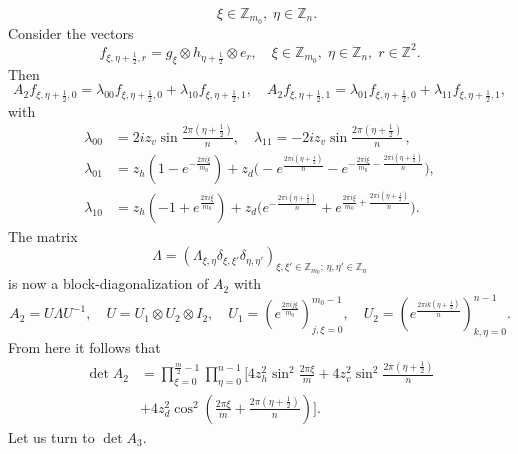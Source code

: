 \documentclass[12pt,reqno]{amsart}
\numberwithin{equation}{section}
\newcommand{\Z}{{\mathbb Z}}
\newcommand{\La}{\Lambda}
\newcommand{\la}{\lambda}
\newcommand{\de}{\delta}
\begin{document}
\begin{appendix}
\begin{equation}
\quad \xi\in\Z_{m_0},\; \eta\in\Z_n.
\end{equation}
Consider the vectors
\begin{equation}\label{k2m6}
f_{\xi,\eta+\frac{1}{2},r}=g_{\xi}\otimes h_{\eta+\frac{1}{2}}\otimes e_r,\quad \xi\in\Z_{m_0},\; \eta\in\Z_n,\; r\in \Z^2.
\end{equation}
Then
\begin{equation}\label{k2m7}
A_2 f_{\xi,\eta+\frac{1}{2},0}=\la_{00}f_{\xi,\eta+\frac{1}{2},0}+\la_{10}f_{\xi,\eta+\frac{1}{2},1},\quad
A_2 f_{\xi,\eta+\frac{1}{2},1}=\la_{01}f_{\xi,\eta+\frac{1}{2},0}+\la_{11}f_{\xi,\eta+\frac{1}{2},1},
\end{equation}
with
\begin{equation}\label{k2m8}
\begin{aligned}
\la_{00}&=2iz_v\sin\frac{2\pi \left(\eta+\frac{1}{2}\right)}{n},\quad 
\la_{11}=-2iz_v \sin\frac{2\pi \left(\eta+\frac{1}{2}\right)}{n}\,,\\
\la_{01}&=z_h(1-e^{-\frac{2\pi i\xi}{m_0}})+z_d\big(-e^{\frac{2\pi i\left(\eta+\frac{1}{2}\right)}{n}}
-e^{-\frac{2\pi i\xi}{m_0}-\frac{2\pi i\left(\eta+\frac{1}{2}\right)}{n}}\big),\\
\la_{10}&=z_h(-1+e^{\frac{2\pi i\xi}{m_0}})+z_d\big(e^{-\frac{2\pi i\left(\eta+\frac{1}{2}\right)}{n}}
+e^{\frac{2\pi i\xi}{m_0}+\frac{2\pi i\left(\eta+\frac{1}{2}\right)}{n}}\big).
\end{aligned}
\end{equation}
The matrix 
\begin{equation}\label{k12a}
\La=\left(\La_{\xi,\eta}\de_{\xi,\xi'}\de_{\eta,\eta'}\right)_{\xi,\xi'\in \Z_{m_0};\, \eta,\eta'\in\Z_n}
\end{equation}
is now a  block-diagonalization of $A_2$ with
\begin{equation}\label{k13a}
A_2=U\La U^{-1}, \quad U=U_1\otimes U_2\otimes I_2,\quad U_1=\left( e^{\frac{2\pi i j\xi}{m_{0}}}\right)_{j,\xi=0}^{m_0-1},\quad
U_2=\left( e^{\frac{2\pi ik\left(\eta+\frac{1}{2}\right)}{n} }\right)_{k,\eta=0}^{n-1}.
\end{equation}
From here it follows that
\begin{equation}\label{k2m9}
\begin{aligned}
\det A_2 &=\prod_{\xi=0}^{\frac{m}{2}-1}\prod_{\eta=0}^{n-1}\Bigg[4z_h^2 \sin^2\frac{2\pi \xi}{m}
+4z_v^2 \sin^2\frac{2\pi \left(\eta+\frac{1}{2}\right)}{n} \\
&+4z_d^2\cos^2\left(\frac{2\pi \xi}{m}+\frac{2\pi \left(\eta+\frac{1}{2}\right)}{n}\right)\Bigg].
\end{aligned}
\end{equation}
Let us turn to $\det A_3$.


\end{appendix}
\end{document}
